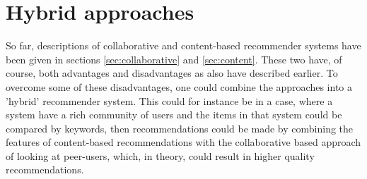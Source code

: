 \newpage
\section{Hybrid approaches}
\label{sec:hybrid}
So far, descriptions of collaborative and content-based recommender systems have been given in sections \ref{sec:collaborative} and \ref{sec:content}. These two have, of course, both advantages and disadvantages as also have described earlier. To overcome some of these disadvantages, one could combine the approaches into a 'hybrid' recommender system. This could for instance be in a case, where a system have a rich community of users and the items in that system could be compared by keywords, then recommendations could be made by combining the features of content-based recommendations with the collaborative based approach of looking at peer-users, which, in theory, could result in higher quality recommendations.\newline

